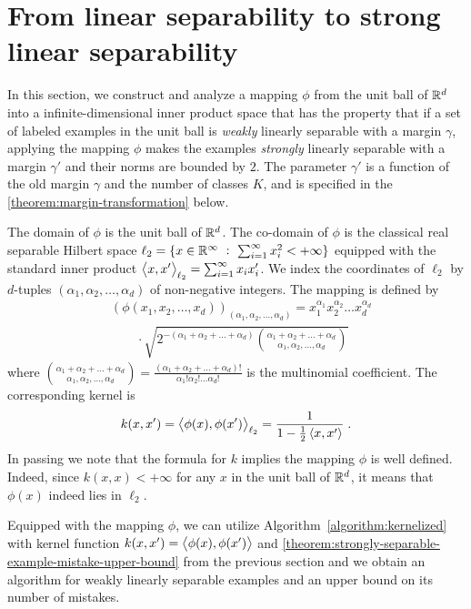 \section{From linear separability to strong linear separability}
\label{section:from-linear-separability-to-strong-linear-separability}

In this section, we construct and analyze a mapping $\phi$ from the unit ball of
$\mathbb{R}^d$ into a infinite-dimensional inner product space that has the property
that if a set of labeled examples in the unit ball is \emph{weakly} linearly
separable with a margin $\gamma$, applying the mapping $\phi$ makes the examples
\emph{strongly} linearly separable with a margin $\gamma'$ and their norms are
bounded by $2$. The parameter $\gamma'$ is a function of the old margin $\gamma$
and the number of classes $K$, and is specified in the
\autoref{theorem:margin-transformation} below.

The domain of $\phi$ is the unit ball of $\mathbb{R}^d$. The co-domain of $\phi$ is the classical real separable Hilbert space
$\ell_2 = \{ x \in \mathbb{R}^\infty ~:~ \sum_{i=1}^\infty x_i^2 < + \infty \}$ equipped
with the standard inner product $\left\langle x, x' \right\rangle_{\ell_2} = \sum_{i=1}^\infty x_i x'_i$. We index the coordinates of
$\ell_2$ by $d$-tuples $(\alpha_1, \alpha_2, \dots, \alpha_d)$ of non-negative
integers. The mapping is defined by
\begin{align*}
& \left(\phi(x_1, x_2, \dots, x_d)\right)_{(\alpha_1, \alpha_2, \dots, \alpha_d)} = x_1^{\alpha_1} x_2^{\alpha_2} \dots x_d^{\alpha_d} \\
& \qquad \cdot \sqrt{2^{-(\alpha_1 + \alpha_2 + \dots + \alpha_d)} \binom{\alpha_1 + \alpha_2 + \dots + \alpha_d}{\alpha_1, \alpha_2, \dots, \alpha_d}}
\end{align*}
where $\binom{\alpha_1 + \alpha_2 + \dots + \alpha_d}{\alpha_1, \alpha_2, \dots, \alpha_d} = \frac{(\alpha_1 + \alpha_2 + \dots + \alpha_d)!}{\alpha_1! \alpha_2! \dots \alpha_d!}$
is the multinomial coefficient. The corresponding kernel is
$$
k(x,x') = \left\langle \phi(x), \phi(x') \right\rangle_{\ell_2} = \frac{1}{1 - \frac{1}{2}\left\langle x, x' \right\rangle} \; .
$$
In passing we note that the formula for $k$ implies the mapping $\phi$ is
well defined. Indeed, since $k(x,x) < +\infty$ for any $x$ in the unit
ball of $\mathbb{R}^d$, it means that $\phi(x)$ indeed lies in $\ell_2$.

Equipped with the mapping $\phi$, we can utilize
Algorithm~\ref{algorithm:kernelized} with kernel function $k(x,x') =
\left\langle \phi(x), \phi(x') \right\rangle$ and
\autoref{theorem:strongly-separable-example-mistake-upper-bound} from the
previous section and we obtain an algorithm for weakly linearly separable
examples and an upper bound on its number of mistakes.

